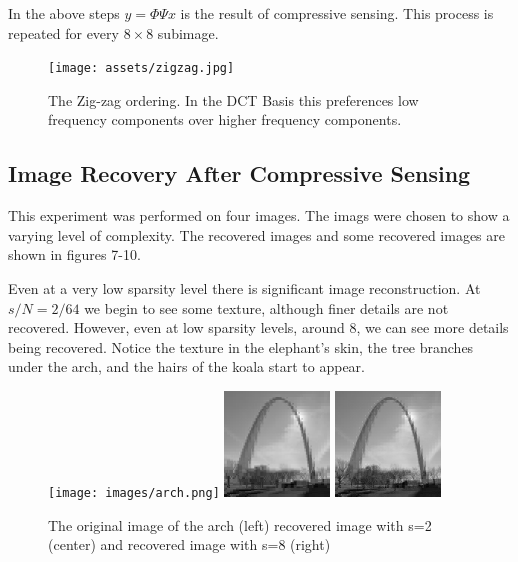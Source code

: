 \documentclass{article}
\begin{document}
In the above steps $y = \Phi \Psi x$ is the result of compressive sensing.
This process is repeated for every $8 \times 8$ subimage.

\begin{figure}[H]
    \captionsetup{width=.5\linewidth}
    \centering
        \texttt{[image: assets/zigzag.jpg]}
        \caption{The Zig-zag ordering. In the DCT Basis this preferences low frequency components over higher frequency components.}
\end{figure}


\newpage
\subsection*{Image Recovery After Compressive Sensing}

This experiment was performed on four images.
The imags were chosen to show a varying level of complexity.
The recovered images and some recovered images are shown in figures 7-10.

Even at a very low sparsity level there is significant image reconstruction.
At $s/N = 2/64$ we begin to see some texture, although finer details are not recovered.
However, even at low sparsity levels, around 8, we can see more details being recovered.
Notice the texture in the elephant's skin, the tree branches under the arch, and the hairs of the koala start to appear.

\begin{figure}[H]
    \captionsetup{width=.5\linewidth}
    \centering
        \texttt{[image: images/arch.png]}
        \includegraphics[width=0.25\textwidth]{images/arch-recovered_02.png}
        \includegraphics[width=0.25\textwidth]{images/arch-recovered_08.png}
        \caption{The original image of the arch (left) recovered image with s=2 (center) and recovered image with s=8 (right)}
\end{figure}
\end{document}
